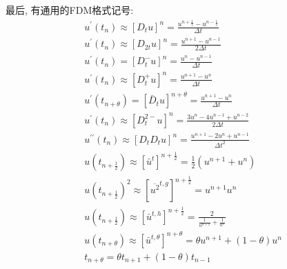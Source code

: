 最后, 有通用的FDM格式记号:
\begin{equation}
    \begin{aligned}
        &u^{\prime}\left(t_{n}\right) \approx\left[D_{t} u\right]^{n}=\frac{u^{n+\frac{1}{2}}-u^{n-\frac{1}{2}}}{\Delta t}\\
        &u^{\prime}\left(t_{n}\right) \approx\left[D_{2 t} u\right]^{n}=\frac{u^{n+1}-u^{n-1}}{2 \Delta t}\\
        &u^{\prime}\left(t_{n}\right)=\left[D_{t}^{-} u\right]^{n}=\frac{u^{n}-u^{n-1}}{\Delta t}\\
        &u^{\prime}\left(t_{n}\right) \approx\left[D_{t}^{+} u\right]^{n}=\frac{u^{n+1}-u^{n}}{\Delta t}\\
        &u^{\prime}\left(t_{n+\theta}\right)=\left[\bar{D}_{t} u\right]^{n+\theta}=\frac{u^{n+1}-u^{n}}{\Delta t}\\
        &u^{\prime}\left(t_{n}\right) \approx\left[D_{t}^{2-} u\right]^{n}=\frac{3 u^{n}-4 u^{n-1}+u^{n-2}}{2 \Delta t}\\
        &u^{\prime \prime}\left(t_{n}\right) \approx\left[D_{t} D_{t} u\right]^{n}=\frac{u^{n+1}-2 u^{n}+u^{n-1}}{\Delta t^{2}}\\
        &u\left(t_{n+\frac{1}{2}}\right) \approx\left[\bar{u}^{t}\right]^{n+\frac{1}{2}}=\frac{1}{2}\left(u^{n+1}+u^{n}\right)\\
        &u\left(t_{n+\frac{1}{2}}\right)^{2} \approx\left[{\overline{u^{2}}}^{t, g}\right]^{n+\frac{1}{2}}=u^{n+1} u^{n}\\
        &u\left(t_{n+\frac{1}{2}}\right) \approx\left[\bar{u}^{t, h}\right]^{n+\frac{1}{2}}=\frac{2}{\frac{1}{u^{n+1}}+\frac{1}{u^{n}}}\\
        &u\left(t_{n+\theta}\right) \approx\left[\bar{u}^{t, \theta}\right]^{n+\theta}=\theta u^{n+1}+(1-\theta) u^{n}\\
        &t_{n+\theta}=\theta t_{n+1}+(1-\theta) t_{n-1}
        \end{aligned}
\end{equation}
